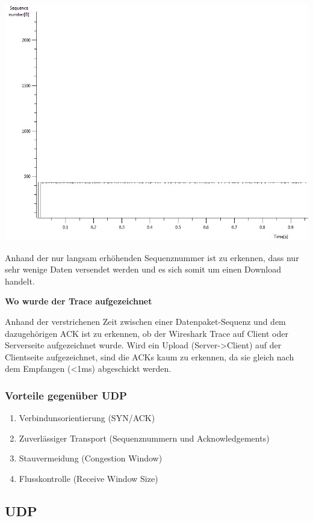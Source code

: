 \includegraphics[scale=0.45]{media/tcptraceDownload.png}

Anhand der nur langsam erhöhenden Sequenznummer ist zu erkennen, dass nur sehr
wenige Daten versendet werden und es sich somit um einen Download handelt.

\textbf{Wo wurde der Trace aufgezeichnet}

Anhand der verstrichenen Zeit zwischen einer Datenpaket-Sequenz und dem
dazugehörigen ACK ist zu erkennen, ob der Wireshark Trace auf Client oder
Serverseite aufgezeichnet wurde. Wird ein Upload (Server->Client) auf der
Clientseite aufgezeichnet, sind die ACKs kaum zu erkennen, da sie gleich nach
dem Empfangen (<1ms) abgeschickt werden.

\subsubsection{Vorteile gegenüber UDP}

\begin{enumerate}
	\item Verbindunsorientierung (SYN/ACK)
	\item Zuverlässiger Transport (Sequenznummern und Acknowledgements)
	\item Stauvermeidung (Congestion Window)
	\item Flusskontrolle (Receive Window Size)
\end{enumerate}


\subsection{UDP}


